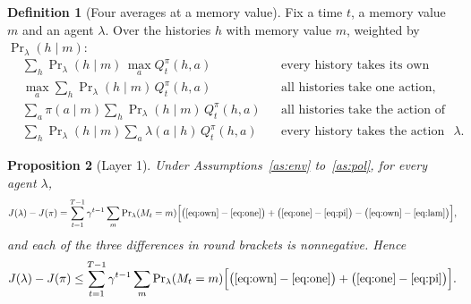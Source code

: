 \documentclass{article}
\newtheorem{proposition}{Proposition}[section]
\theoremstyle{definition}
\newtheorem{definition}[proposition]{Definition}
\numberwithin{equation}{section}
\newcommand{\Prl}{\Pr\nolimits_{\lambda}}
\begin{document}
\begin{definition}[Four averages at a memory value]\label{def:four}
Fix a time $t$, a memory value $m$ and an agent $\lambda$. Over the histories $h$ with memory value $m$, weighted by $\Prl(h\mid m)$:
\begin{align}
&\sum_h\Prl (h\mid m)\,\max_aQ^\pi_t(h,a) &&\text{every history takes its own best action,} \label{eq:own}\\
&\max_a\sum_h\Prl (h\mid m)\,Q^\pi_t(h,a) &&\text{all histories take one action, the best on average,} \label{eq:one}\\
&\sum_a\pi(a\mid m)\sum_h\Prl (h\mid m)\,Q^\pi_t(h,a) &&\text{all histories take the action of our policy,} \label{eq:pi}\\
&\sum_h\Prl (h\mid m)\sum_a\lambda(a\mid h)\,Q^\pi_t(h,a) &&\text{every history takes the action of $\lambda$.} \label{eq:lam}
\end{align}
\end{definition}

\begin{proposition}[Layer 1]\label{prop:layer1}
Under Assumptions~\ref{as:env} to~\ref{as:pol}, for every agent $\lambda$,
\[
J(\lambda)-J(\pi)=\sum_{t=1}^{T-1}\gamma^{t-1}\sum_m\Prl (M_t=m)\Big[\big(\eqref{eq:own}-\eqref{eq:one}\big)+\big(\eqref{eq:one}-\eqref{eq:pi}\big)-\big(\eqref{eq:own}-\eqref{eq:lam}\big)\Big],
\]
and each of the three differences in round brackets is nonnegative. Hence
\[
J(\lambda)-J(\pi)\le\sum_{t=1}^{T-1}\gamma^{t-1}\sum_m\Prl (M_t=m)\Big[\big(\eqref{eq:own}-\eqref{eq:one}\big)+\big(\eqref{eq:one}-\eqref{eq:pi}\big)\Big].
\]
\end{proposition}
\end{document}
